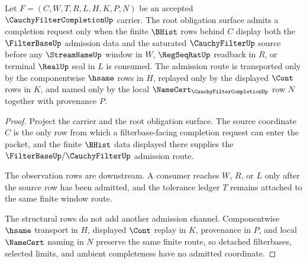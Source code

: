 \begin{theorem}
\label{thm:cauchy-filter-completion-root-filterbase-admission}
Let $F=(C,W,T,R,L,H,K,P,N)$ be an accepted $\CauchyFilterCompletionUp$ carrier. The root obligation surface admits a completion request only when the finite $\BHist$ rows behind $C$ display both the $\FilterBaseUp$ admission data and the saturated $\CauchyFilterUp$ source before any $\StreamNameUp$ window in $W$, $\RegSeqRatUp$ readback in $R$, or terminal $\RealUp$ seal in $L$ is consumed. The admission route is transported only by the componentwise $\hsame$ rows in $H$, replayed only by the displayed $\Cont$ rows in $K$, and named only by the local $\NameCert_{\CauchyFilterCompletionUp}$ row $N$ together with provenance $P$.
\end{theorem}
\begin{proof}
Project the carrier and the root obligation surface. The source coordinate $C$ is the only row from which a filterbase-facing completion request can enter the packet, and the finite $\BHist$ data displayed there supplies the $\FilterBaseUp/\CauchyFilterUp$ admission route.

The observation rows are downstream. A consumer reaches $W$, $R$, or $L$ only after the source row has been admitted, and the tolerance ledger $T$ remains attached to the same finite window route.

The structural rows do not add another admission channel. Componentwise $\hsame$ transport in $H$, displayed $\Cont$ replay in $K$, provenance in $P$, and local $\NameCert$ naming in $N$ preserve the same finite route, so detached filterbases, selected limits, and ambient completeness have no admitted coordinate.
\end{proof}

